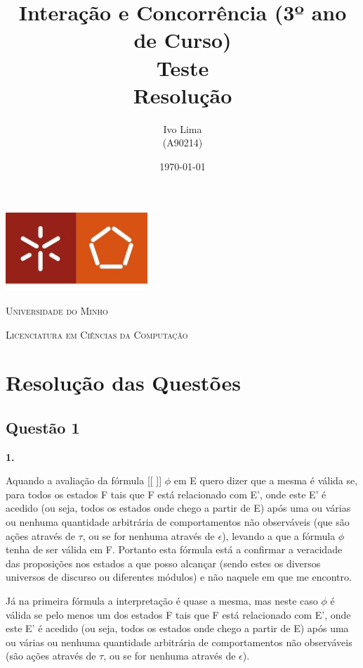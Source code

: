 \documentclass[11pt,a4paper]{report}
\title{Interação e Concorrência (3º ano de Curso)\\
       \textbf{Teste}\\ Resolução
       } %
\author{ Ivo Lima\\ (A90214)
       } %
\date{\today} %
\begin{document}
	\begin{minipage}{0.9\linewidth}
        \centering
		\includegraphics[width=0.4\textwidth]{um.jpeg}\par\vspace{1cm}
		{\scshape\LARGE Universidade do Minho} \par
		\vspace{0.6cm}
		{\scshape\Large Licenciatura em Ciências da Computação} \par
		\maketitle
	\end{minipage}


\tableofcontents %

\chapter{Resolução das Questões}

\section{Questão 1}

\textbf{1.} 

Aquando a avaliação da fórmula [[ ]] $\phi$ em E quero dizer que a mesma é válida se, para todos os estados F tais que F está relacionado com E', onde este E' é acedido (ou seja, todos os estados onde chego a partir de E) após uma ou várias ou nenhuma quantidade arbitrária de comportamentos não observáveis (que são ações através de $\tau$, ou se for nenhuma através de $\epsilon$), levando a que a fórmula $\phi$ tenha de ser válida em F. Portanto esta fórmula está a confirmar a veracidade das proposições nos estados a que posso alcançar (sendo estes os diversos universos de discurso ou diferentes módulos) e não naquele em que me encontro.

Já na primeira fórmula a interpretação é quase a mesma, mas neste caso $\phi$ é válida se pelo menos um dos estados F tais que F está relacionado com E', onde este E' é acedido (ou seja, todos os estados onde chego a partir de E) após uma ou várias ou nenhuma quantidade arbitrária de comportamentos não observáveis (são ações através de $\tau$, ou se for nenhuma através de $\epsilon$).
\end{document}
